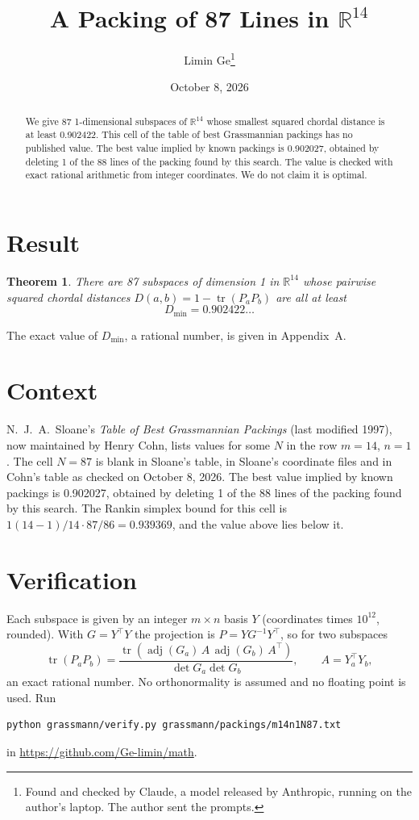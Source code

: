 \documentclass[11pt,a4paper]{article}
\title{A Packing of 87 Lines in $\mathbb{R}^{14}$}
\author{Limin Ge\thanks{Found and checked by Claude, a model released by Anthropic, running on the author's laptop. The author sent the prompts.}}
\date{October 8, 2026}
\newtheorem*{theorem}{Theorem}
\begin{document}
\maketitle
\begin{abstract}
We give 87 1-dimensional subspaces of $\mathbb{R}^{14}$ whose smallest squared chordal distance is at least 0.902422. This cell of the table of best Grassmannian packings has no published value. The best value implied by known packings is 0.902027, obtained by deleting 1 of the 88 lines of the packing found by this search. The value is checked with exact rational arithmetic from integer coordinates. We do not claim it is optimal.
\end{abstract}

\section{Result}
\begin{theorem}
There are 87 subspaces of dimension 1 in $\mathbb{R}^{14}$ whose pairwise squared chordal distances $D(a,b) = 1 - \operatorname{tr}(P_aP_b)$ are all at least
\[ D_{\min} = 0.902422\ldots \]
\end{theorem}
The exact value of $D_{\min}$, a rational number, is given in Appendix~A.


\section{Context}
N.~J.~A.~Sloane's \emph{Table of Best Grassmannian Packings} (last modified 1997), now maintained by Henry Cohn, lists values for some $N$ in the row $m=14$, $n=1$. The cell $N=87$ is blank in Sloane's table, in Sloane's coordinate files and in Cohn's table as checked on October 8, 2026. The best value implied by known packings is 0.902027, obtained by deleting 1 of the 88 lines of the packing found by this search. The Rankin simplex bound for this cell is $1(14-1)/14\cdot 87/86 = 0.939369$, and the value above lies below it.


\section{Verification}
Each subspace is given by an integer $m\times n$ basis $Y$ (coordinates times $10^{12}$, rounded). With $G=Y^\top Y$ the projection is $P=YG^{-1}Y^\top$, so for two subspaces
\[ \operatorname{tr}(P_aP_b)=\frac{\operatorname{tr}(\operatorname{adj}(G_a)\,A\,\operatorname{adj}(G_b)\,A^\top)}{\det G_a\det G_b},\qquad A=Y_a^\top Y_b, \]
an exact rational number. No orthonormality is assumed and no floating point is used. Run
\begin{verbatim}
python grassmann/verify.py grassmann/packings/m14n1N87.txt
\end{verbatim}
in \url{https://github.com/Ge-limin/math}.
\end{document}
